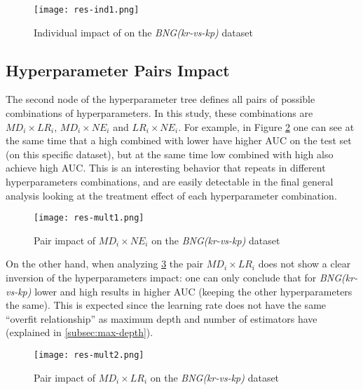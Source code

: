 \begin{figure}[!h]
    \centering
    \texttt{[image: res-ind1.png]} 
    \caption{Individual impact of \textbf{} on the \textit{BNG(kr-vs-kp)} dataset}
    \label{fig:res-ind1}
\end{figure}

\subsection{Hyperparameter Pairs Impact}
\label{subsec:double-impact}

The second node of the hyperparameter tree defines all pairs of possible combinations of hyperparameters. In this study, these combinations are $MD_i \times LR_i$, $MD_i \times NE_i$ and $LR_i \times NE_i$. For example, in Figure \ref{fig:res-mult1} one can see at the same time that a high \textbf{} combined with lower \textbf{} have higher AUC on the test set (on this specific dataset), but at the same time low \textbf{} combined with high \textbf{} also achieve high AUC. This is an interesting behavior that repeats in different hyperparameters combinations, and are easily detectable in the final general analysis looking at the treatment effect of each hyperparameter combination.

\begin{figure}[!h]
    \centering
    \texttt{[image: res-mult1.png]} 
    \caption{Pair impact of $MD_i \times NE_i$  on the \textit{BNG(kr-vs-kp)} dataset}
    \label{fig:res-mult1}
\end{figure}

On the other hand, when analyzing \ref{fig:res-mult2} the pair $MD_i \times LR_i$ does not show a clear inversion of the hyperparameters impact: one can only conclude that for \textit{BNG(kr-vs-kp)} lower \textbf{} and high \textbf{} results in higher AUC (keeping the other hyperparameters the same). This is expected since the learning rate does not have the same ``overfit relationship'' as maximum depth and number of estimators have (explained in \ref{subsec:max-depth}).

\begin{figure}[!h]
    \centering
    \texttt{[image: res-mult2.png]}
    \caption{Pair impact of $MD_i \times LR_i$  on the \textit{BNG(kr-vs-kp)} dataset}
    \label{fig:res-mult2}
\end{figure}

